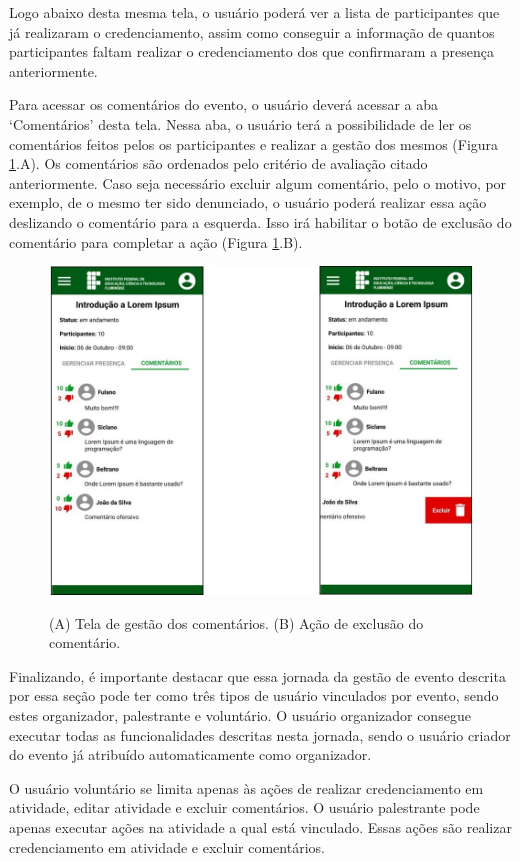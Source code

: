 Logo abaixo desta mesma tela, o usuário poderá ver a lista de participantes que já realizaram o credenciamento, assim como conseguir a informação de quantos participantes faltam realizar o credenciamento dos que confirmaram a presença anteriormente.

Para acessar os comentários do evento, o usuário deverá acessar a aba ‘Comentários’ desta tela. Nessa aba, o usuário terá a possibilidade de ler os comentários feitos pelos os participantes e realizar a gestão dos mesmos (Figura \ref{fig:gestao17}.A). Os comentários são ordenados pelo critério de avaliação citado anteriormente. Caso seja necessário excluir algum comentário, pelo o motivo, por exemplo, de o mesmo ter sido denunciado, o usuário poderá realizar essa ação deslizando o comentário para a esquerda. Isso irá habilitar o botão de exclusão do comentário para completar a ação (Figura \ref{fig:gestao17}.B).

\begin{figure}[H]
    \centering
    \caption{(A) Tela de gestão dos comentários. (B) Ação de exclusão do comentário.}
    \includegraphics[scale=0.63]{figuras/Gestao/17-18.jpg}
    \label{fig:gestao17}
\end{figure}

Finalizando, é importante destacar que essa jornada da gestão de evento descrita por essa seção pode ter como três tipos de usuário vinculados por evento, sendo estes organizador, palestrante e voluntário. O usuário organizador consegue executar todas as funcionalidades descritas nesta jornada, sendo o usuário criador do evento já atribuído automaticamente como organizador. 

O usuário voluntário se limita apenas às ações de realizar credenciamento em atividade, editar atividade e excluir comentários. O usuário palestrante pode apenas executar ações na atividade a qual está vinculado. Essas ações são realizar credenciamento em atividade e excluir comentários.
